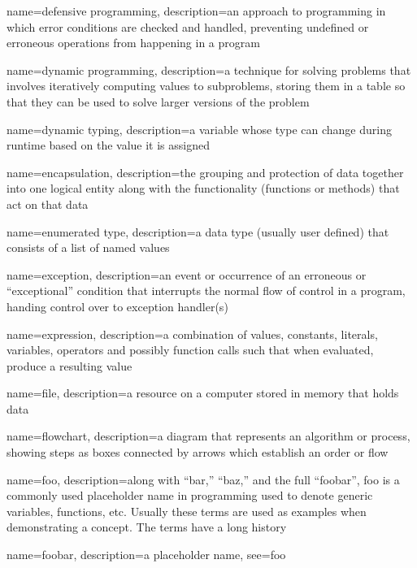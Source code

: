 {
  name=defensive programming,
  description={an approach to programming in which error conditions are checked and handled, preventing undefined or
  	erroneous operations from happening in a program}
}

{
  name=dynamic programming,
  description={a technique for solving problems that involves iteratively computing values to subproblems, storing them in a table so that they can be used to solve larger versions of the problem}
}

{
  name=dynamic typing,
  description={a variable whose type can change during runtime based on the value it is assigned}
}

{
  name=encapsulation,
  description={the grouping and protection of data together into one logical entity along with the functionality (functions or methods)
  	that act on that data}
}

{
  name=enumerated type,
  description={a data type (usually user defined) that consists of a list of named values}
}

{
  name=exception,
  description={an event or occurrence of an erroneous or ``exceptional'' condition that interrupts the normal flow of control in a program, handing control over to exception handler(s)}
}

{
  name=expression,
  description={a combination of values, constants, literals, variables, operators and possibly function calls such that when evaluated, produce a resulting value}
}

{
  name=file,
  description={a resource on a computer stored in memory that holds data}
}

{
  name=flowchart,
  description={a diagram that represents an algorithm or process, showing steps as boxes connected by arrows which establish an
  order or flow}
}

{
  name=foo,
  description={along with ``bar,'' ``baz,'' and the full ``foobar'', foo is a commonly used placeholder name in programming used to denote generic variables, functions, etc. Usually these terms are used as examples when demonstrating a concept.  The terms have a long history \cite{DBLP:journals/rfc/rfc3092}}
}


{
  name=foobar,
  description={a placeholder name},
  see={foo}
}


